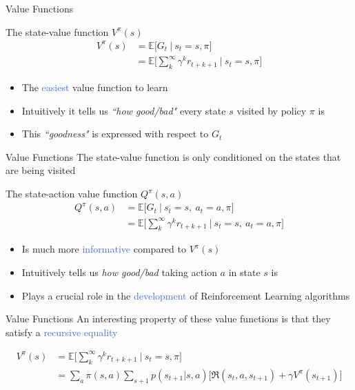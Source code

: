\documentclass{beamer}
\begin{document}
\begin{frame}{Value Functions}
	\begin{block}{The state-value function $V^{\pi}(s)$}
		\begin{align*}
			V^{\pi}(s) & = \mathds{E} \bigg[G_t \: \big| \: s_t=s,\pi \bigg] \\ 
				& = \mathds{E} \bigg[\sum_{k}^{\infty}\gamma^{k} r_{t+k+1} \: \bigg| \: s_t=s,\pi \bigg]
		\end{align*}
	\end{block}

	\begin{itemize}
		\item The \textcolor{RoyalBlue}{easiest} value function to learn
		\item Intuitively it tells us \textit{``how good/bad"} every state $s$ visited by policy $\pi$ is
		\item This \textit{``goodness"} is expressed with respect to $G_t$
	\end{itemize}

\end{frame}

\begin{frame}{Value Functions}
	The state-value function is only conditioned on the states that are being visited
	
	\begin{block}{The state-action value function $Q^{\pi}(s,a)$}
		\begin{align*}
		Q^{\pi}(s,a) & = \mathds{E} \bigg[G_t \: \big| \: s_t=s, \: a_t=a,  \pi \bigg] \\ 
			& = \mathds{E} \bigg[\sum_{k}^{\infty}\gamma^{k} r_{t+k+1} \: \bigg| \: s_t=s, \: a_t=a, \pi \bigg]
		\end{align*}
	\end{block}

	\begin{itemize}
		\item Is much more \textcolor{RoyalBlue}{informative} compared to $V^{\pi}(s)$
		\item Intuitively tells us \textit{how good/bad} taking action $a$ in state $s$ is
		\item Plays a crucial role in the \textcolor{RoyalBlue}{development} of Reinforcement Learning algorithms
	\end{itemize}

\end{frame}

\begin{frame}{Value Functions}
	An interesting property of these value functions is that they satisfy a \textcolor{RoyalBlue}{recursive equality}

		\begin{align*}
			V^{\pi}(s) & = \mathds{E} \bigg[\sum_{k}^{\infty}\gamma^{k} r_{t+k+1} \: \bigg| \: s_t=s,\pi \bigg] \\
			   & = \sum_a \pi(s,a) \sum_{s+1} p(s_{t+1}|s,a)\big[\Re(s_t, a, s_{t+1}) + \gamma V^{\pi}(s_{t+1}) \big] 
		\end{align*}
\end{frame}
\end{document}
